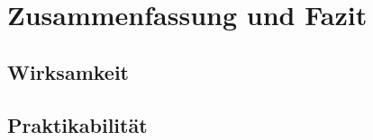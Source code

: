 \chapter{Zusammenfassung und Fazit}
\label{chap:fazit}


\section{Wirksamkeit}

\section{Praktikabilität}
